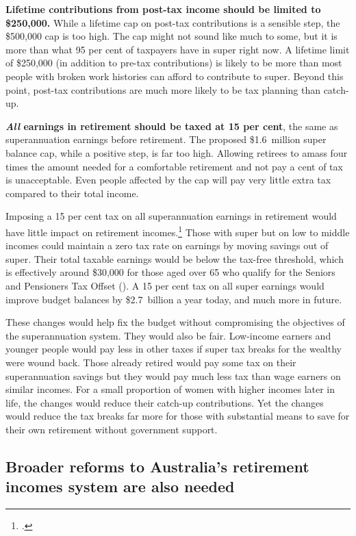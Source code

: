\documentclass[continuous]{grattan}\usepackage[]{graphicx}\usepackage[]{color}
\begin{document}
\textbf{Lifetime contributions from post-tax income should be limited to \$250,000.} 
While a lifetime cap on post-tax contributions is a sensible step, the \$500,000 cap is too high. 
The cap might not sound like much to some, but it is more than what 95 per cent of taxpayers have in super right now. 
A lifetime limit of \$250,000 (in addition to pre-tax contributions) is likely to be more than most people with broken work histories can afford to contribute to super. Beyond this point, post-tax contributions are much more likely to be tax planning than catch-up.

\textbf{\emph{All} earnings in retirement should be taxed at 15 per cent}, the same as superannuation earnings before retirement. 
The proposed \$1.6~million super balance cap, while a positive step, is far too high. %
Allowing retirees to amass four times the amount needed for a comfortable retirement and not pay a cent of tax is unacceptable. 
Even people affected by the cap will pay very little extra tax compared to their total income.

Imposing a 15 per cent tax on all superannuation earnings in retirement would have little impact on retirement incomes.\footcite[][63]{DaleyCoatesWoodEtAl2015Super} 
Those with super but on low to middle incomes could maintain a zero tax rate on earnings by moving savings out of super. 
Their total taxable earnings would be below the tax-free threshold, which is effectively around \$30,000 for those aged over 65 who qualify for the Seniors and Pensioners Tax Offset (\SAPTO{}). 
A 15 per cent tax on all super earnings would improve budget balances by \$2.7~billion a year today, and much more in future.

These changes would help fix the budget without compromising the objectives of the superannuation system. 
They would also be fair. 
Low-income earners and younger people would pay less in other taxes if super tax breaks for the wealthy were wound back. 
Those already retired would pay some tax on their superannuation savings but they would pay much less tax than wage earners on similar incomes. For a small proportion of women with higher incomes later in life, the changes would reduce their catch-up contributions. 
Yet the changes would reduce the tax breaks far more for those with substantial means to save for their own retirement without government support.

\subsection{Broader reforms to Australia's retirement incomes system are also needed}\label{broader-reforms-to-australias-retirement-incomes-system-are-also-needed}
\end{document}
